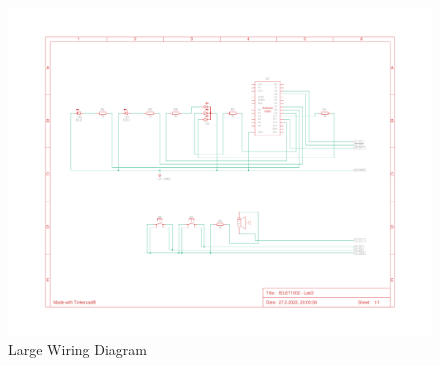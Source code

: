 \documentclass[journal]{IEEEtran}
\begin{document}
\begin{landscape}

    \begin{figure}[h]%
        \begin {center}
        \includegraphics[width=1.5\textwidth, trim={0 2cm 0 2cm}]{images/wiring-diagram.pdf}
        \caption{Large Wiring Diagram}
        \label{fig:wiringLarge}
        \end {center}
    \end{figure}


\end{landscape}
\end{document}
